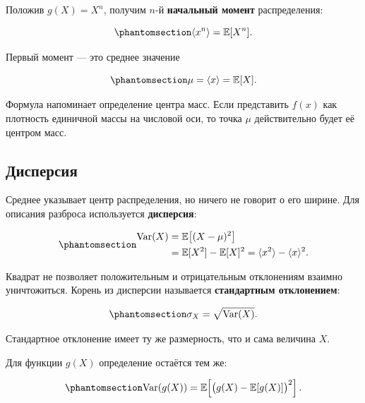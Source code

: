\documentclass[
  russian,
  11pt,
  a4paper,
  open=any]{scrbook}
\begin{document}
Положив \(g(X)=X^n\), получим \(n\)-й \textbf{начальный момент}
распределения:

\begin{equation}\protect\phantomsection\label{eq-raw-moment}{
\langle x^n\rangle=\mathbb E[X^n].
}\end{equation}

Первый момент --- это среднее значение

\begin{equation}\protect\phantomsection\label{eq-distribution-mean}{
\mu=\langle x\rangle=\mathbb E[X].
}\end{equation}

Формула напоминает определение центра масс. Если представить \(f(x)\)
как плотность единичной массы на числовой оси, то точка \(\mu\)
действительно будет её центром масс.

\subsection{Дисперсия}\label{ux434ux438ux441ux43fux435ux440ux441ux438ux44f}

Среднее указывает центр распределения, но ничего не говорит о его
ширине. Для описания разброса используется \textbf{дисперсия}:

\begin{equation}\protect\phantomsection\label{eq-variance-definition}{
\begin{aligned}
\operatorname{Var}(X)
&=\mathbb E\!\left[(X-\mu)^2\right]\\
&=\mathbb E[X^2]-\mathbb E[X]^2
=\langle x^2\rangle-\langle x\rangle^2.
\end{aligned}
}\end{equation}

Квадрат не позволяет положительным и отрицательным отклонениям взаимно
уничтожиться. Корень из дисперсии называется \textbf{стандартным
отклонением}:

\begin{equation}\protect\phantomsection\label{eq-standard-deviation-definition}{
\sigma_X=\sqrt{\operatorname{Var}(X)}.
}\end{equation}

Стандартное отклонение имеет ту же размерность, что и сама величина
\(X\).

Для функции \(g(X)\) определение остаётся тем же:

\begin{equation}\protect\phantomsection\label{eq-function-variance}{
\operatorname{Var}(g(X))
=\mathbb E\!\left[
\bigl(g(X)-\mathbb E[g(X)]\bigr)^2
\right].
}\end{equation}
\end{document}
